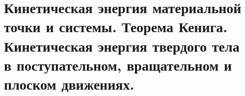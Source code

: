 \chapter{Кинетическая энергия материальной точки и системы. Теорема Кенига.
Кинетическая энергия твердого тела в поступательном, вращательном и плоском
движениях.}

\newpage

